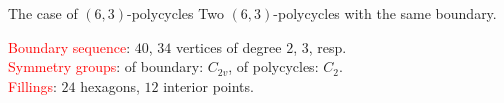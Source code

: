 \documentclass[%
pdf,
colorBG,
slideColor,
]{prosper}
\begin{document}
\begin{slide}{The case of $(6,3)$-polycycles}
\vspace{-3mm}
Two $(6,3)$-polycycles with the same boundary.


\begin{center}
\begin{minipage}{55mm}
\end{minipage}
\begin{minipage}{55mm}
\end{minipage}
\textcolor{red}{Boundary sequence}: $40$, $34$ vertices of degree $2$, $3$, resp.\\
\textcolor{red}{Symmetry groups}: of boundary: $C_{2v}$, of polycycles: $C_2$.\\
\textcolor{red}{Fillings}: $24$ hexagons, $12$ interior points.
\end{center}




\end{slide}
\end{document}
